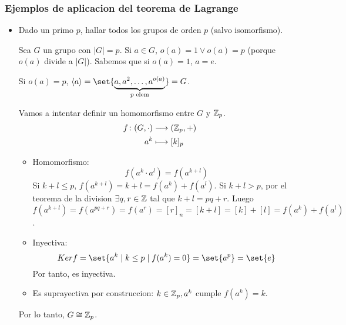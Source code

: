 \subsubsection{Ejemplos de aplicacion del teorema de Lagrange}
\begin{example}
	\begin{itemize}
		\item Dado un primo \(p \), hallar todos los grupos de orden \(p \) (salvo isomorfismo).
		      
		      Sea \(G \) un grupo con \(|G| = p \). Si \(a \in G \), \(o(a) = 1 \vee o(a) = p \) (porque \(o(a )\) divide a \(|G| \)). Sabemos que si \(o(a) = 1 \), \(a = e \).
		      
		      Si \(o(a) = p \), \(\langle a \rangle = \set{\underbrace{a, a^{2}, \ldots, a^{o(a)}}_{p \text{ elem} }  } = G \).
		      
		      Vamos a intentar definir un homomorfismo entre \(G \) y \(\mathbb{Z}_p \).
		      \[
			      \begin{aligned}
				      f \colon (G, \cdot ) & \longrightarrow (\mathbb{Z}_p, + ) \\
				      a^{k}                & \longmapsto [k]_p
			      \end{aligned}
		      \]
		      \begin{itemize}
			      \item Homomorfismo:
			            \[
				            f(a^{k} \cdot a^{l}) = f(a^{k + l} )
			            \]
			            Si \(k + l \leq  p \), \(f(a^{k + l} ) = k + l = f(a^{k} ) + f(a^{l} )\). Si \(k + l > p \), por el teorema de la division \(\exists q, r \in \mathbb{Z} \) tal que \(k + l = pq + r \). Luego \(f(a^{k + l} ) = f(a^{pq + r} ) = f(a^{r} ) = [r]_n = [k + l] = [k] + [l] = f(a^{k} ) + f(a^{l} )\).
			      \item Inyectiva:
			            \[
				            Kerf = \set{a^{k} \mid k \leq p \mid f(a^{k} ) = 0 } = \set{a^{p} } = \set{e}
			            \]
			            Por tanto, es inyectiva.
			      \item Es suprayectiva por construccion: \(k \in \mathbb{Z}_p, a^{k } \) cumple \(f(a^{k} ) = k\).
		      \end{itemize}
		      Por lo tanto, \(G \cong \mathbb{Z}_p \).
		      

\end{itemize}
\end{example}
